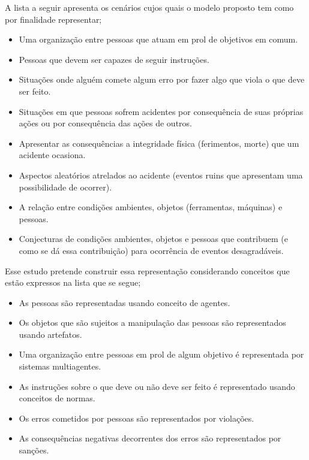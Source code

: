 A lista a seguir apresenta os cenários cujos quais o modelo proposto tem como por finalidade representar;
\begin{itemize}
    \item Uma organização entre pessoas que atuam em prol de objetivos em comum.
    \item Pessoas que devem ser capazes de seguir instruções. 
    \item Situações onde alguém comete algum erro por fazer algo que viola o que deve ser feito. 
    \item Situações em que pessoas sofrem acidentes por consequência de suas próprias ações ou por consequência das ações de outros. 
    \item Apresentar as consequências a integridade física (ferimentos, morte) que um acidente ocasiona. 
    \item Aspectos aleatórios atrelados ao acidente (eventos ruins que apresentam uma possibilidade de ocorrer). 
    \item A relação entre condições ambientes, objetos (ferramentas, máquinas) e pessoas. 
    \item Conjecturas de condições ambientes, objetos e pessoas que contribuem (e como se dá essa contribuição) para ocorrência de eventos desagradáveis. 
\end{itemize} 

Esse estudo pretende construir essa representação considerando conceitos que estão expressos na lista que se segue; 

\begin{itemize}
	\item As pessoas são representadas usando conceito de agentes.
	\item Os objetos que são sujeitos a manipulação das pessoas são representados usando artefatos.
	\item Uma organização entre pessoas em prol de algum objetivo é representada por sistemas multiagentes. 
	\item As instruções sobre o que deve ou não deve ser feito é representado usando conceitos de normas.	
	\item Os erros cometidos por pessoas são representados por violações. 
	\item As consequências negativas decorrentes dos erros são representados por sanções.	
\end{itemize}